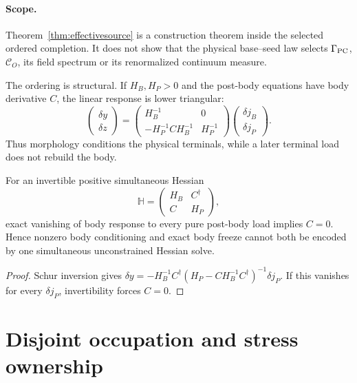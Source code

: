 \paragraph{Scope.}
Theorem~\ref{thm:effectivesource} is a construction theorem inside the
selected ordered completion.  It does not show that the physical base--seed
law selects $\Gamma_{\rm PC}$, $\mathcal C_O$, its field spectrum or its
renormalized continuum measure.

The ordering is structural. If $H_B,H_P>0$ and the post-body equations have
body derivative $C$, the linear response is lower triangular:
\begin{equation}
\begin{pmatrix}\delta y\\\delta z\end{pmatrix}
=\begin{pmatrix}H_B^{-1}&0\\-H_P^{-1}CH_B^{-1}&H_P^{-1}\end{pmatrix}
\begin{pmatrix}\delta j_B\\\delta j_P\end{pmatrix}.
\label{eq:triangular}
\end{equation}
Thus morphology conditions the physical terminals, while a later terminal
load does not rebuild the body.

\begin{proposition}
For an invertible positive simultaneous Hessian
\begin{equation}
\mathbb H=\begin{pmatrix}H_B&C^\dagger\\C&H_P\end{pmatrix},
\end{equation}
exact vanishing of body response to every pure post-body load implies $C=0$.
Hence nonzero body conditioning and exact body freeze cannot both be encoded
by one simultaneous unconstrained Hessian solve.
\end{proposition}
\begin{proof}
Schur inversion gives
$\delta y=-H_B^{-1}C^\dagger
(H_P-CH_B^{-1}C^\dagger)^{-1}\delta j_P$.
If this vanishes for every $\delta j_P$, invertibility forces $C=0$.
\end{proof}

\section{Disjoint occupation and stress ownership}

